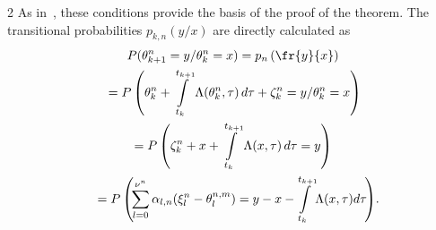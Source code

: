 \begin{multicols}{2}
As in~\cite{4-b, 5-b}, these conditions provide the basis of the proof of the theorem. 
The transitional probabilities $p_{k,n} (y/x)$ are directly calculated as
\begin{multline*}
P(\theta_{k+1}^{n}  =y/\theta_{k}^{n} = x) = p_{n} \left(\fr{y}{x}\right)\\
{} = P\left(\theta_{k}^{n} + \int\limits_{t_{k} }^{t_{k+1} }
\Lambda (\theta_{k}^{n}  ,\tau )\,d\tau +\zeta_{k}^{n}=y/ \theta_{k}^{n} 
=x\right)\\
 = 
P\left(\zeta_{k}^{n} +x+\int\limits_{t_{k} }^{t_{k+1} }\Lambda (x,\tau )\,d\tau =y\right) \\
{}=
P\left(\!\sum\limits_{l=0}^{\nu ^{n} }\alpha_{l,n} ( \xi_{l}^{n} -\theta_{l}^{n,m} )= 
y-x-\!\int\limits_{t_{k} }^{t_{k+1} }\!\Lambda (x,\tau )d\tau \!\right)\!.\hspace*{-5.75145pt}
\end{multline*}


\end{multicols}
